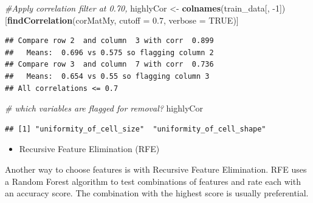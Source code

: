 \documentclass[]{article}
\newenvironment{Shaded}{\begin{snugshade}}{\end{snugshade}}
\newcommand{\KeywordTok}[1]{\textcolor[rgb]{0.13,0.29,0.53}{\textbf{{#1}}}}
\newcommand{\DataTypeTok}[1]{\textcolor[rgb]{0.13,0.29,0.53}{{#1}}}
\newcommand{\DecValTok}[1]{\textcolor[rgb]{0.00,0.00,0.81}{{#1}}}
\newcommand{\FloatTok}[1]{\textcolor[rgb]{0.00,0.00,0.81}{{#1}}}
\newcommand{\StringTok}[1]{\textcolor[rgb]{0.31,0.60,0.02}{{#1}}}
\newcommand{\CommentTok}[1]{\textcolor[rgb]{0.56,0.35,0.01}{\textit{{#1}}}}
\newcommand{\OtherTok}[1]{\textcolor[rgb]{0.56,0.35,0.01}{{#1}}}
\newcommand{\NormalTok}[1]{{#1}}
\providecommand{\tightlist}{%
  \setlength{\itemsep}{0pt}\setlength{\parskip}{0pt}}
\begin{document}
\begin{Shaded}
\begin{Highlighting}[]
\CommentTok{#Apply correlation filter at 0.70,}
\NormalTok{highlyCor <-}\StringTok{ }\KeywordTok{colnames}\NormalTok{(train_data[, -}\DecValTok{1}\NormalTok{])[}\KeywordTok{findCorrelation}\NormalTok{(corMatMy, }\DataTypeTok{cutoff =} \FloatTok{0.7}\NormalTok{, }\DataTypeTok{verbose =} \OtherTok{TRUE}\NormalTok{)]}
\end{Highlighting}
\end{Shaded}

\begin{verbatim}
## Compare row 2  and column  3 with corr  0.899 
##   Means:  0.696 vs 0.575 so flagging column 2 
## Compare row 3  and column  7 with corr  0.736 
##   Means:  0.654 vs 0.55 so flagging column 3 
## All correlations <= 0.7
\end{verbatim}

\begin{Shaded}
\begin{Highlighting}[]
\CommentTok{# which variables are flagged for removal?}
\NormalTok{highlyCor}
\end{Highlighting}
\end{Shaded}

\begin{verbatim}
## [1] "uniformity_of_cell_size"  "uniformity_of_cell_shape"
\end{verbatim}

\begin{Shaded}
\end{Shaded}

\begin{itemize}
\tightlist
\item
  Recursive Feature Elimination (RFE)
\end{itemize}

Another way to choose features is with Recursive Feature Elimination.
RFE uses a Random Forest algorithm to test combinations of features and
rate each with an accuracy score. The combination with the highest score
is usually preferential.
\end{document}
